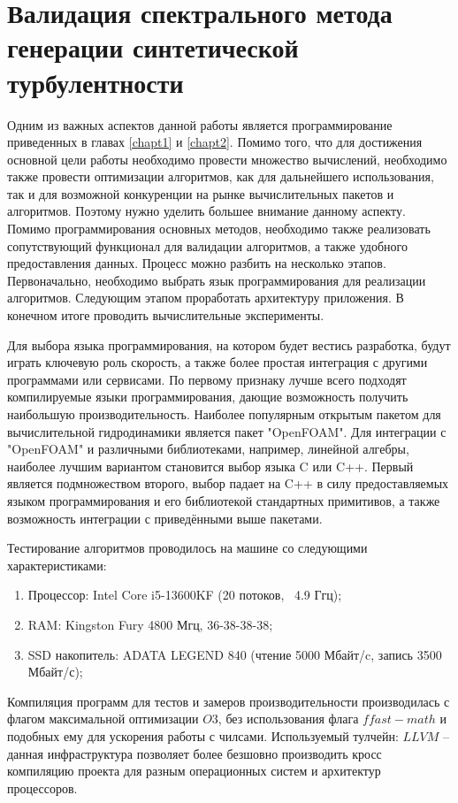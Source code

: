 \chapter{Валидация спектрального метода генерации синтетической турбулентности} \label{chapt4}

Одним из важных аспектов данной работы является программирование приведенных в главах \ref{chapt1} и \ref{chapt2}. Помимо того, что для достижения основной цели работы необходимо провести множество вычислений, необходимо также провести оптимизации алгоритмов, как для дальнейшего использования, так и для возможной конкуренции на рынке вычислительных пакетов и алгоритмов. Поэтому нужно уделить большее внимание данному аспекту. Помимо программирования основных методов, необходимо также реализовать сопутствующий функционал для валидации алгоритмов, а также удобного предоставления данных. Процесс можно разбить на несколько этапов. Первоначально, необходимо выбрать язык программирования для реализации алгоритмов. Следующим этапом проработать архитектуру приложения. В конечном итоге проводить вычислительные эксперименты.

Для выбора языка программирования, на котором будет вестись разработка, будут играть ключевую роль скорость, а также более простая интеграция с другими программами или сервисами. По первому признаку лучше всего подходят компилируемые языки программирования, дающие возможность получить наибольшую производительность. Наиболее популярным открытым пакетом для вычислительной гидродинамики является пакет "OpenFOAM". Для интеграции с "OpenFOAM" и различными библиотеками, например, линейной алгебры, наиболее лучшим вариантом становится выбор языка C или C++. Первый является подмножеством второго, выбор падает на C++ в силу предоставляемых языком программирования и его библиотекой стандартных примитивов, а также возможность интеграции с приведёнными выше пакетами. 

Тестирование алгоритмов проводилось на машине со следующими характеристиками:

\begin{enumerate}
	\item Процессор: Intel Core i5-13600KF (20 потоков, ~4.9 Ггц);
	\item RAM: Kingston Fury 4800 Мгц, 36-38-38-38;
	\item SSD накопитель: ADATA LEGEND 840 (чтение 5000 Мбайт/c, запись 3500 Мбайт/с);
\end{enumerate}

Компиляция программ для тестов и замеров производительности производилась с флагом максимальной оптимизации $O3$, без использования флага $ffast-math$ и подобных ему для ускорения работы с чилсами. Используемый тулчейн: $LLVM$ -- данная инфраструктура позволяет более безшовно производить кросс компиляцию проекта для разным операционных систем и архитектур процессоров.

